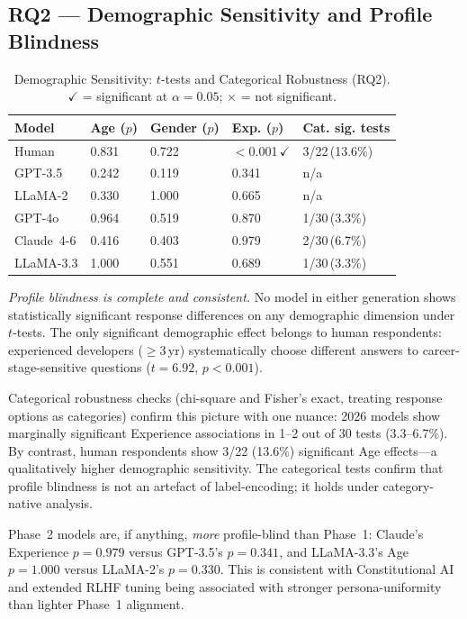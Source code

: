 \documentclass[12pt,a4paper]{article}
\begin{document}
\subsection{RQ2 --- Demographic Sensitivity and Profile Blindness}
\label{sec:results:ttest}

\begin{table}[ht]
\caption{Demographic Sensitivity: $t$-tests and Categorical Robustness (RQ2).
  $\checkmark$ = significant at $\alpha{=}0.05$;
  $\times$ = not significant.}
\label{tab:ttest}
\centering\small
\setlength{\tabcolsep}{4pt}
\begin{tabular}{lllll}
\toprule
\textbf{Model} & \textbf{Age} ($p$) & \textbf{Gender} ($p$)
  & \textbf{Exp.} ($p$) & \textbf{Cat. sig. tests} \\
\midrule
Human       & 0.831 & 0.722 & $<$0.001\,$\checkmark$
  & 3/22\,(13.6\%) \\
\midrule
GPT-3.5     & 0.242 & 0.119 & 0.341 & n/a \\
LLaMA-2     & 0.330 & 1.000 & 0.665 & n/a \\
\midrule
GPT-4o      & 0.964 & 0.519 & 0.870 & 1/30\,(3.3\%) \\
Claude~4-6  & 0.416 & 0.403 & 0.979 & 2/30\,(6.7\%) \\
LLaMA-3.3   & 1.000 & 0.551 & 0.689 & 1/30\,(3.3\%) \\
\bottomrule
\end{tabular}
\end{table}

\emph{Profile blindness is complete and consistent.}
No model in either generation shows statistically significant response
differences on any demographic dimension under $t$-tests.
The only significant demographic effect belongs to human respondents:
experienced developers ($\geq 3$\,yr) systematically choose different
answers to career-stage-sensitive questions ($t{=}6.92$, $p{<}0.001$).

Categorical robustness checks (chi-square and Fisher's exact, treating
response options as categories) confirm this picture with one nuance:
2026 models show marginally significant Experience associations in 1--2
out of 30 tests (3.3--6.7\%).
By contrast, human respondents show 3/22 (13.6\%) significant Age
effects---a qualitatively higher demographic sensitivity.
The categorical tests confirm that profile blindness is not an artefact
of label-encoding; it holds under category-native analysis.

Phase~2 models are, if anything, \emph{more} profile-blind than
Phase~1: Claude's Experience $p{=}0.979$ versus GPT-3.5's $p{=}0.341$,
and LLaMA-3.3's Age $p{=}1.000$ versus LLaMA-2's $p{=}0.330$.
This is consistent with Constitutional AI and extended RLHF tuning
being associated with stronger persona-uniformity than lighter
Phase~1 alignment.
\end{document}

